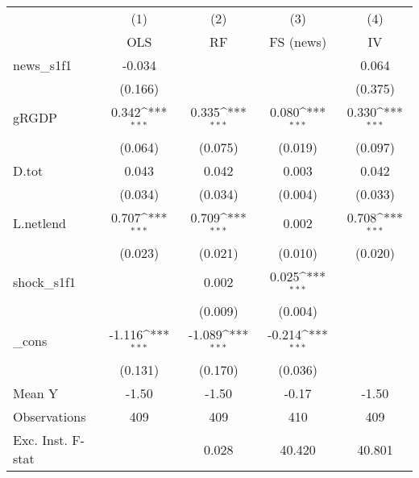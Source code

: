 {
\def\sym#1{\ifmmode^{#1}\else\(^{#1}\)\fi}
\begin{tabular}{l*{4}{c}}
\toprule
            &\multicolumn{1}{c}{(1)}&\multicolumn{1}{c}{(2)}&\multicolumn{1}{c}{(3)}&\multicolumn{1}{c}{(4)}\\
            &\multicolumn{1}{c}{OLS}&\multicolumn{1}{c}{RF}&\multicolumn{1}{c}{FS (news)}&\multicolumn{1}{c}{IV}\\
\midrule
news\_s1f1   &      -0.034         &                     &                     &       0.064         \\
            &     (0.166)         &                     &                     &     (0.375)         \\
\addlinespace
gRGDP       &       0.342\sym{***}&       0.335\sym{***}&       0.080\sym{***}&       0.330\sym{***}\\
            &     (0.064)         &     (0.075)         &     (0.019)         &     (0.097)         \\
\addlinespace
D.tot       &       0.043         &       0.042         &       0.003         &       0.042         \\
            &     (0.034)         &     (0.034)         &     (0.004)         &     (0.033)         \\
\addlinespace
L.netlend   &       0.707\sym{***}&       0.709\sym{***}&       0.002         &       0.708\sym{***}\\
            &     (0.023)         &     (0.021)         &     (0.010)         &     (0.020)         \\
\addlinespace
shock\_s1f1  &                     &       0.002         &       0.025\sym{***}&                     \\
            &                     &     (0.009)         &     (0.004)         &                     \\
\addlinespace
\_cons      &      -1.116\sym{***}&      -1.089\sym{***}&      -0.214\sym{***}&                     \\
            &     (0.131)         &     (0.170)         &     (0.036)         &                     \\
\midrule
Mean Y      &       -1.50         &       -1.50         &       -0.17         &       -1.50         \\
Observations&         409         &         409         &         410         &         409         \\
Exc. Inst. F-stat&                     &       0.028         &      40.420         &      40.801         \\
\bottomrule
\end{tabular}
}

